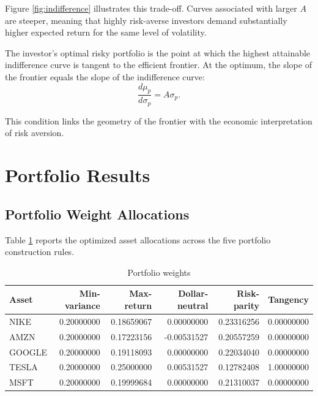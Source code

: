 \documentclass[wcp]{jmlr}
\begin{document}
Figure \ref{fig:indifference} illustrates this trade-off. Curves associated with larger $A$ are steeper, meaning that highly risk-averse investors demand substantially higher expected return for the same level of volatility.

The investor’s optimal risky portfolio is the point at which the highest attainable indifference curve is tangent to the efficient frontier. At the optimum, the slope of the frontier equals the slope of the indifference curve:
\begin{equation}
\frac{d\mu_p}{d\sigma_p} = A\sigma_p.
\end{equation}

This condition links the geometry of the frontier with the economic interpretation of risk aversion.

\section{Portfolio Results}

\subsection{Portfolio Weight Allocations}

Table \ref{tab:weights} reports the optimized asset allocations across the five portfolio construction rules.

\begin{table}[H]
\centering
\caption{Portfolio weights}
\label{tab:weights}
\small
\begin{tabular}{lrrrrr}
\toprule
Asset & Min-variance & Max-return & Dollar-neutral & Risk-parity & Tangency \\
\midrule
NIKE   & 0.20000000 & 0.18659067 &  0.00000000 & 0.23316256 & 0.00000000 \\
AMZN   & 0.20000000 & 0.17223156 & -0.00531527 & 0.20557259 & 0.00000000 \\
GOOGLE & 0.20000000 & 0.19118093 &  0.00000000 & 0.22034040 & 0.00000000 \\
TESLA  & 0.20000000 & 0.25000000 &  0.00531527 & 0.12782408 & 1.00000000 \\
MSFT   & 0.20000000 & 0.19999684 &  0.00000000 & 0.21310037 & 0.00000000 \\
\bottomrule
\end{tabular}
\end{table}
\end{document}
